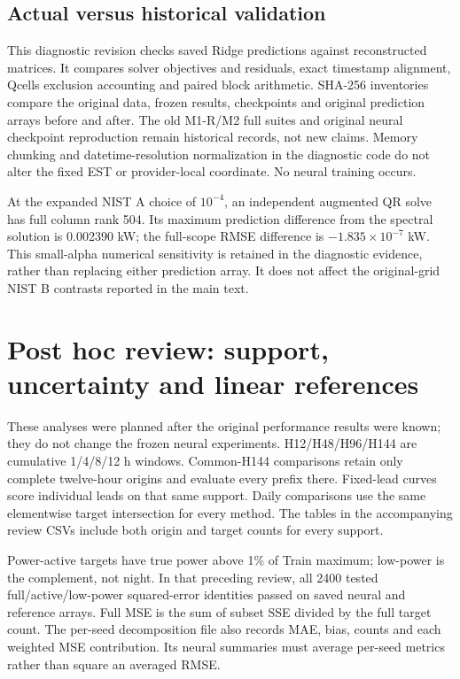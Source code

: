 \subsection{Actual versus historical validation}
This diagnostic revision checks saved Ridge predictions against reconstructed matrices. It compares solver objectives and residuals, exact timestamp alignment, Qcells exclusion accounting and paired block arithmetic. SHA-256 inventories compare the original data, frozen results, checkpoints and original prediction arrays before and after. The old M1-R/M2 full suites and original neural checkpoint reproduction remain historical records, not new claims. Memory chunking and datetime-resolution normalization in the diagnostic code do not alter the fixed EST or provider-local coordinate. No neural training occurs.

At the expanded NIST A choice of $10^{-4}$, an independent augmented QR solve has full column rank 504. Its maximum prediction difference from the spectral solution is 0.002390 kW; the full-scope RMSE difference is $-1.835\times10^{-7}$ kW. This small-alpha numerical sensitivity is retained in the diagnostic evidence, rather than replacing either prediction array. It does not affect the original-grid NIST B contrasts reported in the main text.


\section{Post hoc review: support, uncertainty and linear references}
These analyses were planned after the original performance results were known; they do not change the frozen neural experiments. H12/H48/H96/H144 are cumulative 1/4/8/12 h windows. Common-H144 comparisons retain only complete twelve-hour origins and evaluate every prefix there. Fixed-lead curves score individual leads on that same support. Daily comparisons use the same elementwise target intersection for every method. The tables in the accompanying review CSVs include both origin and target counts for every support.

Power-active targets have true power above 1\% of Train maximum; low-power is the complement, not night. In that preceding review, all 2400 tested full/active/low-power squared-error identities passed on saved neural and reference arrays. Full MSE is the sum of subset SSE divided by the full target count. The per-seed decomposition file also records MAE, bias, counts and each weighted MSE contribution. Its neural summaries must average per-seed metrics rather than square an averaged RMSE.

